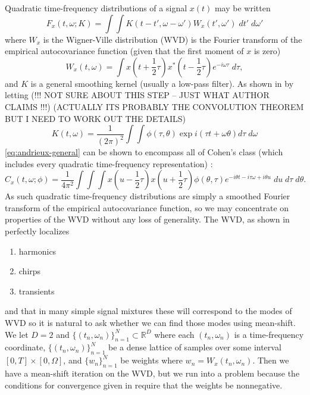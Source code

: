 \documentclass[english]{article}
\begin{document}
Quadratic time-frequency distributions of a signal $x(t)$ may be written \cite[eq. 5]{andrieux87}
\begin{equation}\label{eq:andrieux-general}
F_x(t,\omega ; K)=\int\int K(t-t',\omega-\omega')W_x(t',\omega')\;dt'\;d\omega'
\end{equation}
where  $W_x$ is the Wigner-Ville distribution (WVD) is the Fourier transform of the empirical
autocovariance function (given that the first moment of $x$ is zero)
\begin{equation}\label{eq:wigner-ville-distribution}
  W_x(t,\omega) = \int x(t+\frac{1}{2}\tau)x^*(t-\frac{1}{2}\tau)e^{-i\omega\tau}\;d\tau,
\end{equation} 
and $K$ is a general smoothing kernel (usually a low-pass filter). As shown in \cite{andrieux87} by
letting (!!! NOT SURE ABOUT THIS STEP -- JUST WHAT AUTHOR CLAIMS !!!) (ACTUALLY ITS PROBABLY THE CONVOLUTION
THEOREM BUT I NEED TO WORK OUT THE DETAILS)
\begin{equation}
K(t,\omega) = \frac{1}{(2\pi)^2} \int\int \phi(\tau,\theta)\exp{i(\tau t +\omega\theta)}d\tau\;d\omega
\end{equation}
\autoref{eq:andrieux-general} can be shown to encompass all of  Cohen's class (which includes every
quadratic time-frequency representation) \cite[p. 136]{cohen95}:
\begin{equation}\label{eq:cohen-general}
C_x(t,\omega ; \phi)=\frac{1}{4\pi^2} \int\int\int x(u-\frac{1}{2}\tau)x(u+\frac{1}{2}\tau)\phi(\theta,\tau)e^{-i\theta t-i\tau\omega+i\theta u}\;du\;d\tau\;d\theta.
\end{equation}
As such quadratic time-frequency distributions are simply a smoothed
Fourier transform of the empirical autocovariance function, so we may concentrate on 
properties of the WVD without any loss of generality. The WVD, as shown in \cite[ch. 2]{cohen95}
perfectly localizes
\begin{enumerate}
\item harmonics
\item chirps
\item transients
\end{enumerate}
and that in many simple signal mixtures these will correspond to the modes of WVD so it is natural to ask whether we can find
those modes using mean-shift.
We let $D=2$ and $\{(t_n,\omega_n)\}_{n=1}^N\subset\mathbb{R}^D$ where each $(t_n,\omega_n)$ is a time-frequency coordinate,
$\{(t_n,\omega_n)\}_{n=1}^N$ be a dense lattice of samples over some interval $[0,T]\times [0,\Omega]$, and
$\{w_n\}_{n=1}^N$ be weights where $w_n=W_x(t_n,\omega_n )$. Then we have a mean-shift iteration on the WVD, but
we run into a problem because the conditions for convergence given in \cite{Comaniciu02} require that the weights
be nonnegative.
\end{document}

